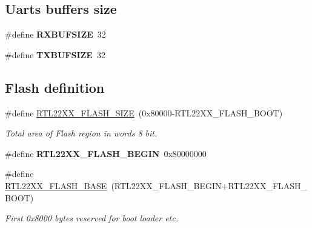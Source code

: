 \subsection*{Uarts buffers size}
\begin{DoxyCompactItemize}
\item 
\mbox{\label{group__RTEMSBSPsARMRTL22XX_ga4a941b75a2cf56698a1e769d8214fd50}} 
\#define {\bfseries R\+X\+B\+U\+F\+S\+I\+ZE}~32
\item 
\mbox{\label{group__RTEMSBSPsARMRTL22XX_ga9a01f28179d1f97c65ac28919f6f1cdb}} 
\#define {\bfseries T\+X\+B\+U\+F\+S\+I\+ZE}~32
\end{DoxyCompactItemize}
\subsection*{Flash definition}
\begin{DoxyCompactItemize}
\item 
\mbox{\label{group__RTEMSBSPsARMRTL22XX_ga0364bc2817f4e1bec63da5c6d331201f}} 
\#define \mbox{\hyperlink{group__RTEMSBSPsARMRTL22XX_ga0364bc2817f4e1bec63da5c6d331201f}{R\+T\+L22\+X\+X\+\_\+\+F\+L\+A\+S\+H\+\_\+\+S\+I\+ZE}}~(0x80000-\/\+R\+T\+L22\+X\+X\+\_\+\+F\+L\+A\+S\+H\+\_\+\+B\+O\+O\+T)
\begin{DoxyCompactList}\small\item\em Total area of Flash region in words 8 bit. \end{DoxyCompactList}\item 
\mbox{\label{group__RTEMSBSPsARMRTL22XX_gafcc9a685facab66ab93f367ba449bec2}} 
\#define {\bfseries R\+T\+L22\+X\+X\+\_\+\+F\+L\+A\+S\+H\+\_\+\+B\+E\+G\+IN}~0x80000000
\item 
\mbox{\label{group__RTEMSBSPsARMRTL22XX_gab8f55a159c52b23cb7e8eddf1a954240}} 
\#define \mbox{\hyperlink{group__RTEMSBSPsARMRTL22XX_gab8f55a159c52b23cb7e8eddf1a954240}{R\+T\+L22\+X\+X\+\_\+\+F\+L\+A\+S\+H\+\_\+\+B\+A\+SE}}~(R\+T\+L22\+X\+X\+\_\+\+F\+L\+A\+S\+H\+\_\+\+B\+E\+G\+IN+R\+T\+L22\+X\+X\+\_\+\+F\+L\+A\+S\+H\+\_\+\+B\+O\+OT)
\begin{DoxyCompactList}\small\item\em First 0x8000 bytes reserved for boot loader etc. \end{DoxyCompactList}\end{DoxyCompactItemize}
